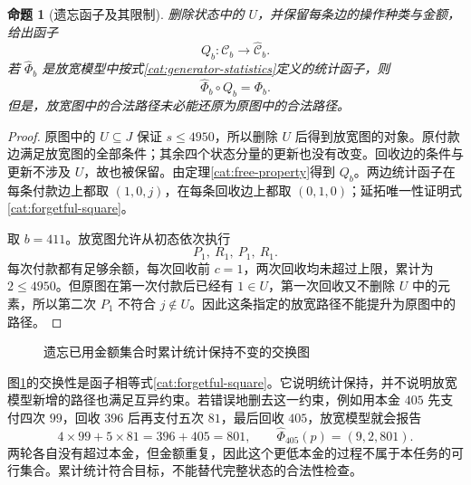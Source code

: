 \documentclass[UTF8,a4paper]{ctexbook}
\newtheorem{proposition}[theorem]{命题}
\theoremstyle{definition}
\numberwithin{equation}{chapter}
\newcommand{\1}{\mathbf{1}}
\begin{document}
\begin{proposition}[遗忘函子及其限制]\label{cat:forgetful}
删除状态中的 $U$，并保留每条边的操作种类与金额，给出函子
\[
Q_b:\mathcal C_b\longrightarrow\widehat{\mathcal C}_b.
\]
若 $\widehat\Phi_b$ 是放宽模型中按式\eqref{cat:generator-statistics}定义的统计函子，则
\begin{equation}\label{cat:forgetful-square}
\widehat\Phi_b\circ Q_b=\Phi_b.
\end{equation}
但是，放宽图中的合法路径未必能还原为原图中的合法路径。
\end{proposition}
\begin{proof}
原图中的 $U\subseteq J$ 保证 $s\le4950$，所以删除 $U$ 后得到放宽图的对象。原付款边满足放宽图的全部条件；其余四个状态分量的更新也没有改变。回收边的条件与更新不涉及 $U$，故也被保留。由定理\ref{cat:free-property}得到 $Q_b$。两边统计函子在每条付款边上都取 $(1,0,j)$，在每条回收边上都取 $(0,1,0)$；延拓唯一性证明式\eqref{cat:forgetful-square}。

取 $b=411$。放宽图允许从初态依次执行
\[
P_1,\ R_1,\ P_1,\ R_1.
\]
每次付款都有足够余额，每次回收前 $c=1$，两次回收均未超过上限，累计为 $2\le4950$。但原图在第一次付款后已经有 $1\in U$，第一次回收又不删除 $U$ 中的元素，所以第二次 $P_1$ 不符合 $j\notin U$。因此这条指定的放宽路径不能提升为原图中的路径。
\end{proof}

\begin{figure}[htbp]
\centering
{}
\caption{遗忘已用金额集合时累计统计保持不变的交换图}
\label{cat:forgetful-diagram}
\end{figure}

图\ref{cat:forgetful-diagram}的交换性是函子相等式\eqref{cat:forgetful-square}。它说明统计保持，并不说明放宽模型新增的路径也满足互异约束。若错误地删去这一约束，例如用本金 $405$ 先支付四次 $99$，回收 $396$ 后再支付五次 $81$，最后回收 $405$，放宽模型就会报告
\[
4\times99+5\times81=396+405=801,
\qquad \widehat\Phi_{405}(p)=(9,2,801).
\]
两轮各自没有超过本金，但金额重复，因此这个更低本金的过程不属于本任务的可行集合。累计统计符合目标，不能替代完整状态的合法性检查。
\end{document}
